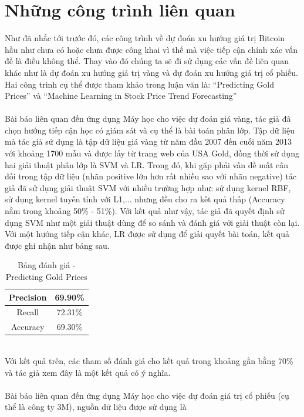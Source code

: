 \chapter{Những công trình liên quan}
Như đã nhắc tới trước đó, các công trình về dự đoán xu hướng giá trị Bitcoin 
hầu như chưa có hoặc chưa được công khai vì thế mà việc tiếp cận chính xác vấn 
đề là điều không thể. Thay vào đó chúng ta sẽ đi sử dụng các vấn đề liên quan 
khác như là dự đoán xu hướng giá trị vàng và dự đoán xu hướng giá trị cổ phiếu.
Hai công trình cụ thể được tham khảo trong luận văn là: 
``Predicting Gold Prices'' \cite{PredictingGoldPrices} và 
``Machine Learning in Stock Price Trend Forecasting'' 
\cite{StockPriceTrendForecasting} \\\\ 
Bài báo \cite{PredictingGoldPrices} liên quan đến ứng dụng Máy học cho việc dự đoán 
giá vàng, tác giả đã chọn hướng tiếp cận học có giám sát và cụ thể là bài toán 
phân lớp. Tập dữ liệu mà tác giả sử dụng là tập dữ liệu giá vàng từ năm đầu 2007 
đến cuối năm 2013 với khoảng 1700 mẫu và được lấy từ trang web của USA Gold, 
đồng thời sử dụng hai giải thuật phân lớp là SVM và LR.
Trong đó, khi gặp phải vấn đề mất cân đối trong tập dữ liệu 
(nhãn positive lớn hơn rất nhiều sao với nhãn negative) tác giả đã sử dụng giải 
thuật SVM với nhiều trường hợp như: sử dụng kernel RBF, sử dụng kernel tuyến tính 
với L1,... nhưng đều cho ra kết quả thấp (Accuracy nằm trong khoảng 50\% - 51\%). 
Với kết quả như vậy, tác giả đã quyết định sử dụng SVM như một giải thuật dùng 
để so sánh và đánh giá với giải thuật còn lại. Với một hướng tiếp cận khác, LR 
được sử dụng để giải quyết bài toán, kết quả được ghi nhận như bảng sau.
\begin{table}[h]
\centering
\begin{tabular}{ |c|c| }
\hline
Precision & 69.90\% \\
\hline
Recall & 72.31\% \\
\hline
Accuracy & 69.30\% \\
\hline
\end{tabular}
\caption{Bảng đánh giá - Predicting Gold Prices}
\end{table}\\
Với kết quả trên, các tham số đánh giá cho kết quả trong khoảng gần bằng 70\% 
và tác giả xem đây là một kết quả có ý nghĩa.\\\\
Bài báo \cite{StockPriceTrendForecasting} liên quan đến ứng dụng Máy học cho việc 
dự đoán giá trị cổ phiếu (cụ thể là công ty 3M), nguồn dữ liệu được sử dụng là 
